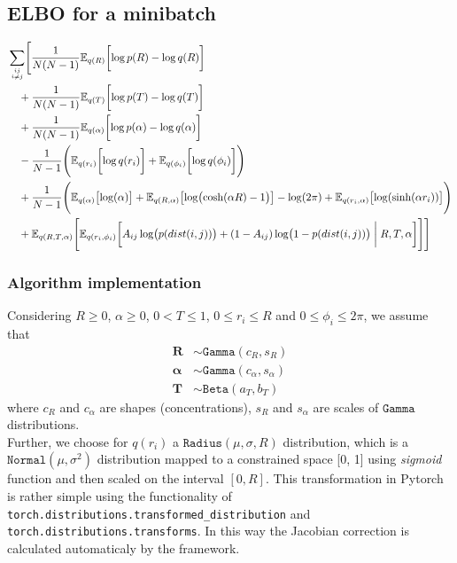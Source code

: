 \documentclass{article}
\renewcommand{\v}[1]{\bm{#1}}
\newcommand{\E}{\mathbb{E}}
\begin{document}
\subsection{ELBO for a minibatch}
\begin{equation}
\begin{split}
& \sum_{ij \atop i \neq j} \Biggl[ \frac{1}{N (N - 1)} \E_{q(R)}\biggl[\log p(R) - \log q(R)\biggr]  \\
& \quad + \frac{1}{N (N - 1)} \E_{q(T)}\biggl[\log p(T) - \log q(T)\biggr]  \\
& \quad + \frac{1}{N (N - 1)} \E_{q(\alpha)}\biggl[\log p(\alpha) - \log q(\alpha)\biggr]  \\
& \quad - \frac{1}{N-1} \Biggl( \E_{q(r_i)} \biggl[\log q(r_i) \biggr] + \E_{q(\phi_i)} \biggl[\log q(\phi_i) \biggr] \Biggr)\\
& \quad + \frac{1}{N-1} \Biggl( \E_{q(\alpha)}\bigl[\log (\alpha) \bigr] + \E_{q(R,\alpha)}\bigl[\log \bigl( \cosh (\alpha R) - 1\bigr) \bigr] - \log(2\pi) + \E_{q(r_i, \alpha)} \bigl[ \log(\sinh(\alpha r_i)) \bigr]\Biggr)\\
& \quad + \E_{q( R,T,\alpha)} \Biggl[ 
\E_{q(r_i, \phi_i)} \biggl[ 
A_{ij} \log \bigl(p(dist(i,j))\bigr) + (1-A_{ij}) \log \bigl(1 - p(dist(i,j))\bigr)  \biggm\vert R,T,\alpha \biggr] \Biggr] \Biggr]
\end{split}
\end{equation}

\subsubsection{Algorithm implementation}

Considering $R \geq 0$, $\alpha \geq 0$, $ 0 < T \leq 1$, $0 \leq r_i \leq R$ and $0 \leq \phi_i \leq 2\pi$, we assume that
\begin{align*}
\v{R} &\sim \mathtt{Gamma}(c_R, s_R)\\
\v{\alpha} &\sim \mathtt{Gamma}(c_\alpha, s_\alpha)\\
\v{T} &\sim \mathtt{Beta}(a_T, b_T)
\end{align*}
where $c_R$ and $c_\alpha$ are shapes (concentrations), $s_R$ and $s_\alpha$ are scales of $\mathtt{Gamma}$ distributions.\\

Further, we choose for $q(r_i)$ a $\mathtt{Radius}(\mu, \sigma, R)$ distribution, which is a $\mathtt{Normal}(\mu, \sigma^2)$ distribution mapped to a constrained space [0, 1] using \textit{sigmoid} function and then scaled on the interval $[0,R]$. This transformation in Pytorch is rather simple using the functionality of \verb|torch.distributions.transformed_distribution| and \verb|torch.distributions.transforms|. In this way the Jacobian correction is calculated automaticaly by the framework.\\
\end{document}
